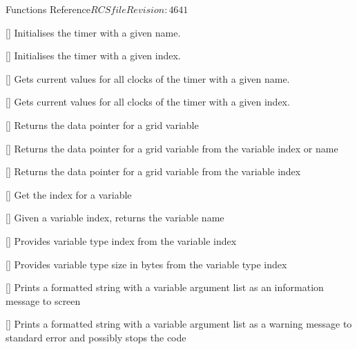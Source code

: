 \begin{cactuspart}{ Functions Reference}{$RCSfile$}{$Revision: 4641 $}
\begin{Lentry}
\item[\code{CCTK\_TimerStart}] [\pageref{CCTK-TimerStart}]
  Initialises the timer with a given name.

\item[\code{CCTK\_TimerStartI}] [\pageref{CCTK-TimerStartI}]
  Initialises the timer with a given index.

\item[\code{CCTK\_TimerStop}] [\pageref{CCTK-TimerStop}]
  Gets current values for all clocks of the timer with a given name.

\item[\code{CCTK\_TimerStopI}] [\pageref{CCTK-TimerStopI}]
  Gets current values for all clocks of the timer with a given index.

\item[\code{CCTK\_VarDataPtr}] [\pageref{CCTK-VarDataPtr}]
  Returns the data pointer for a grid variable

\item[\code{CCTK\_VarDataPtrB}] [\pageref{CCTK-VarDataPtrB}]
  Returns the data pointer for a grid variable from the variable index or name

\item[\code{CCTK\_VarDataPtrI}] [\pageref{CCTK-VarDataPtrI}]
  Returns the data pointer for a grid variable from the variable index

\item[\code{CCTK\_VarIndex}]
   [\pageref{CCTK-VarIndex}]
  Get the index for a variable

\item[\code{CCTK\_VarName}] [\pageref{CCTK-VarName}]
  Given a variable index, returns the variable name

\item[\code{CCTK\_VarTypeI}] [\pageref{CCTK-VarTypeI}]
  Provides variable type index from the variable index

\item[\code{CCTK\_VarTypeSize}] [\pageref{CCTK-VarTypeSize}]
  Provides variable type size in bytes from the variable type index

\item[\code{CCTK\_VInfo}] [\pageref{CCTK-VInfo}]
  Prints a formatted string with a variable argument list as an information
  message to screen

\item[\code{CCTK\_VWarn}] [\pageref{CCTK-VWarn}]
  Prints a formatted string with a variable argument list as a warning message
  to standard error and possibly stops the code


\end{Lentry}
\end{cactuspart}
